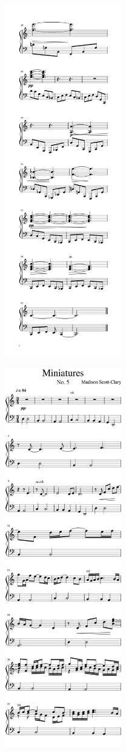 \begin{rightcolumn*}
\noindent\includegraphics[width=2in]{assets/static/miniatures/4-4.png}

\noindent\includegraphics[width=2in]{assets/static/miniatures/5-1.png}


\end{rightcolumn*}
